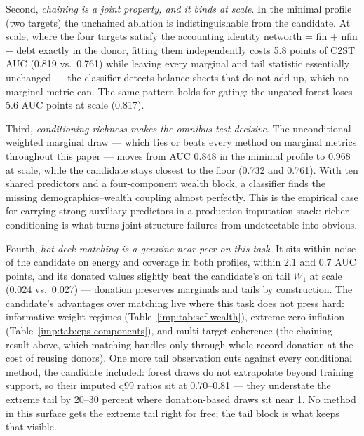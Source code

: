 Second, \emph{chaining is a joint property, and it binds at scale}. In the
minimal profile (two targets) the unchained ablation is indistinguishable
from the candidate. At \populace{} scale, where the four targets satisfy the
accounting identity networth = fin + nfin $-$ debt exactly in the donor,
fitting them independently costs 5.8 points of C2ST AUC (0.819 vs.\ 0.761)
while leaving every marginal and tail statistic essentially unchanged ---
the classifier detects balance sheets that do not add up, which no marginal
metric can. The same pattern holds for gating: the ungated forest loses 5.6
AUC points at scale (0.817).

Third, \emph{conditioning richness makes the omnibus test decisive}. The
unconditional weighted marginal draw --- which ties or beats every method on
marginal metrics throughout this paper --- moves from AUC 0.848 in the
minimal profile to 0.968 at \populace{} scale, while the candidate stays closest
to the floor (0.732 and 0.761). With ten shared predictors and a
four-component wealth block, a classifier finds the missing
demographics--wealth coupling almost perfectly. This is the empirical case
for carrying strong auxiliary predictors in a production imputation stack:
richer conditioning is what turns joint-structure failures from undetectable
into obvious.

Fourth, \emph{hot-deck matching is a genuine near-peer on this task}. It
sits within noise of the candidate on energy and coverage in both profiles,
within 2.1 and 0.7 AUC points, and its donated values slightly beat the
candidate's on tail $W_1$ at scale (0.024 vs.\ 0.027) --- donation preserves
marginals and tails by construction. The candidate's advantages over matching
live where this task does not press hard: informative-weight regimes
(Table~\ref{imp:tab:scf-wealth}), extreme zero inflation
(Table~\ref{imp:tab:cps-components}), and multi-target coherence (the chaining
result above, which matching handles only through whole-record donation at
the cost of reusing donors). One more tail observation cuts against every
conditional method, the candidate included: forest draws do not extrapolate
beyond training support, so their imputed q99 ratios sit at 0.70--0.81 ---
they understate the extreme tail by 20--30 percent where donation-based
draws sit near 1. No method in this surface gets the extreme tail right for
free; the tail block is what keeps that visible.
